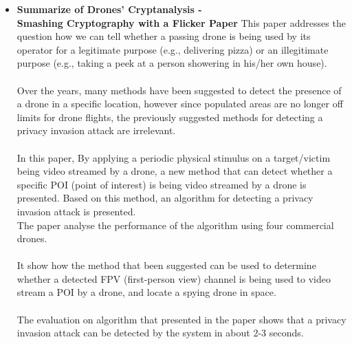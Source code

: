 \begin{itemize}
    \item  \textbf{Summarize of Drones’ Cryptanalysis -} 
    \\ \textbf{Smashing Cryptography with a Flicker Paper}
    This paper \cite{nassi2019drones} addresses the question how we can tell whether a passing drone is being used by its operator for a legitimate purpose (e.g., delivering pizza) or an illegitimate purpose (e.g., taking a peek at a person showering in his/her own house).\\
    \\Over the years, many methods have been suggested to detect the presence of a drone in a specific location, however since populated areas are no longer off limits for drone flights, the previously suggested methods for detecting a privacy invasion attack are irrelevant.\\ 
    \\In this paper, By applying a periodic physical stimulus on a target/victim being video streamed by a drone,  a new method that can detect whether a specific POI (point of interest) is being video streamed by a drone is presented. 
    Based on this method, an algorithm for detecting a privacy invasion attack is presented.\\ 
    The paper analyse the performance of the algorithm using four commercial drones. \\
    \\It show how the method that been suggested can be used to determine whether a detected FPV (first-person view) channel is being used to video stream a POI by a drone, and locate a spying drone in space.\\
    \\The evaluation on algorithm that presented in the paper shows that a privacy invasion attack can be detected by the system in about 2-3 seconds.
    

\end{itemize}
